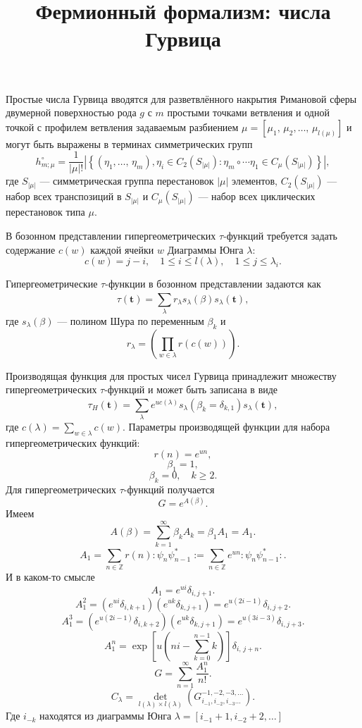 \documentclass[a4paper]{article}
\title{Фермионный формализм: числа Гурвица}
\begin{document}
	\maketitle
Простые числа Гурвица вводятся для разветвлённого накрытия Римановой сферы двумерной
поверхностью рода $g$ с $m$ простыми точками
ветвления и одной точкой с профилем ветвления задаваемым
разбиением $\mu= \left[ \mu_1,\,\mu_2,\ldots,\,\mu_{l(\mu)} \right] $ и могут быть выражены в терминах симметрических
групп
\[
h_{m;\mu}^{\circ}= \frac{1}{|\mu|!}
\left| \left\{ \left( \eta_1,\ldots,\,\eta_m \right) ,
\eta_i \in C_2 \left( S_{|\mu|} \right) \colon 
\eta_m \circ \cdots \eta_1 \in C_\mu \left( S_{|\mu|} \right) \right\}  \right| 
,\] 
где $S_{|\mu|}$ --- симметрическая группа перестановок
$|\mu|$ элементов, $C_2\left( S_{|\mu|} \right) $ ---
набор всех транспозиций в $S_{|\mu|}$ и $C_\mu \left( S_{|\mu|} \right) $ --- набор всех циклических перестановок
типа $\mu$.

В бозонном представлении гипергеометрических  $\tau$-функций
требуется задать содержание $c(w)$ каждой ячейки $w$ 
Диаграммы Юнга $\lambda$:
\[
	c(w)=j-i,\quad 1\le  i\le l(\lambda),\quad
	1\le j\le \lambda_i
.\] 


Гипергеометрические  $\tau$-функции в бозонном представлении
задаются как
\[
	\tau(\mathbf{t})= \sum_{\lambda}^{} r_\lambda
	s_\lambda (\beta) s_\lambda(\mathbf{t}),
\] 
где $s_\lambda(\beta)$ --- полином Шура по переменным $\beta_k$
и
\[
	r_\lambda= \left( \prod_{w\in \lambda}^{} r\left( c(w) \right)   \right) 
.\] 


Производящая функция для простых чисел Гурвица принадлежит
множеству
гипергеометрических $\tau$-функций и может быть записана
в виде
\[
	\tau_{H}\left( \mathbf{t} \right) =
	\sum_{\lambda}^{} e^{u c(\lambda)}s_\lambda
	\left( \beta_k= \delta_{k,1} \right) s_{\lambda}
	(\mathbf{t})
,\] 
где $c(\lambda)= \sum_{w\in \lambda}^{} c(w)$.
Параметры производящей функции для набора гипергеометрических функций:
\[
	r(n)=e^{un},
\]
\[
\beta_1=1,
\]
\[
\beta_k=0,\quad k\ge 2
.\] 
Для гипергеометрических $\tau$-функций получается
\[
	G=e^{A(\beta)}
.\] 
Имеем
\[
	A(\beta)=\sum_{k=1}^{\infty} \beta_k A_k=\beta_1 A_1
	=A_1
.\] 
\[
	A_1= \sum_{n\in \mathbb{Z}}^{} r(n) :\psi_n\psi_{n-1}^*:= \sum_{n\in \mathbb{Z}}^{} e^{un}:\psi_n \psi_{n-1}^*:
.\] 
И в каком-то смысле
\[
A_1=e^{ui}\delta_{i,j+1}
.\] 
\[
	A_1^2=(e^{ui}\delta_{i,k+1})\left( 
	e^{uk}\delta_{k,j+1}\right) =
	e^{u(2i-1)}\delta_{i,j+2}
.\] 
\[
	A_1^3=(e^{u(2i-1)}\delta_{i,k+2})\left( 
	e^{uk}\delta_{k,j+1}\right) =
	e^{u(3i-3)}\delta_{i,j+3}
.\]
\[
	A_1^n=\exp \left[u\left(ni-\sum_{k=0}^{n-1}k\right)
	\right]\delta_{i,\,j+n}
.\] 
\[
G=\sum_{n=1}^{\infty} \frac{A_1^n}{n!}
.\] 
\[
	C_\lambda= \det _{l(\lambda)\times l(\lambda)}
	\left( G^{-1,-2,-3,\ldots}_{i_{-1},i_{-2},i_{-3}\ldots} \right) 
.\]
Где $i_{-k}$ находятся из диаграммы Юнга $\lambda=[i_{-1}+1,
i_{-2}+2,\ldots]$
\end{document}
